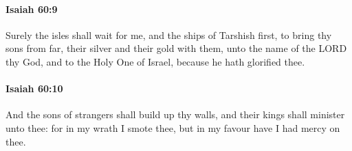 		\paragraph{Isaiah 60:9} %
			\label{ISAIAH-60-9}

			Surely the isles shall wait for me, and the ships of Tarshish first, to bring thy sons from far, their silver and their gold with them, unto the name of the LORD thy God, and to the Holy One of Israel, because he hath glorified thee.


		\paragraph{Isaiah 60:10} %
			\label{ISAIAH-60-10}

			And the sons of strangers shall build up thy walls, and their kings shall minister unto thee: for in my wrath I smote thee, but in my favour have I had mercy on thee.

